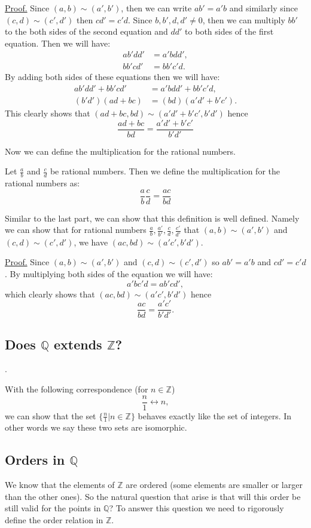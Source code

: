 \underline{Proof.} Since $ (a,b) \sim (a',b') $, then we can write $ ab' = a'b $ and similarly since $ (c,d) \sim (c',d') $ then $ cd' = c'd $. Since $ b,b',d,d' \neq 0 $, then we can multiply $ bb' $ to the both sides of the second equation and $ dd' $ to both sides of the first equation. Then we will have:
\begin{align*}
	ab'dd' &= a'bdd', \\
	bb'cd' &= bb'c'd.
\end{align*}
By adding both sides of these equations then we will have: 
\begin{align*}
	ab'dd' + bb'cd' &= a'bdd' + bb'c'd, \\
	(b'd')(ad+bc) &= (bd)(a'd' + b'c').
\end{align*}
This clearly shows that $ (ad+bc, bd) \sim (a'd'+b'c', b'd') $ hence \[\frac{ad+bc}{bd} = \frac{a'd' + b'c'}{b'd'} \]


Now we can define the multiplication for the rational numbers.
\begin{defbox}
	Let $ \frac{a}{b} $ and $ \frac{c}{d} $ be rational numbers. Then we define the multiplication for the rational numbers as:
	\[ \frac{a}{b} \frac{c}{d} = \frac{ac}{bd} \]
\end{defbox}

Similar to the last part, we can show that this definition is well defined. Namely we can show that for rational numbers $ \frac{a}{b},\frac{a'}{b'},\frac{c}{d},\frac{c'}{d'} $ that $ (a,b) \sim (a',b') $ and $ (c,d) \sim (c',d') $, we have $ (ac,bd) \sim (a'c', b'd') $.

\underline{Proof.} Since $ (a,b) \sim (a',b') $ and $ (c,d) \sim (c',d') $ so $ ab' = a'b $ and $ cd' = c'd $. By multiplying both sides of the equation we will have:
\[ a'bc'd = ab'cd', \] 
which clearly shows that  $ (ac,bd) \sim (a'c', b'd') $ hence
\[ \frac{ac}{bd} =  \frac{a'c'}{b'd'}. \]


\subsection{Does $ \mathbb{Q} $ extends $ \mathbb{Z} $?}.

With the following correspondence (for $ n \in \mathbb{Z} $)
\[ \frac{n}{1} \leftrightarrow n, \]
we can show that the set $ \{ \frac{n}{1} | n\in \mathbb{Z} \} $ behaves exactly like the set of integers. In other words we say these two sets are isomorphic.

\subsection{Orders in $ \mathbb{Q} $}
We know that the elements of $ \mathbb{Z} $ are ordered (some elements are smaller or larger than the other ones). So the natural question that arise is that will this order be still valid for the points in $ \mathbb{Q} $? To answer this question we need to rigorously define the order relation in $ \mathbb{Z} $.

